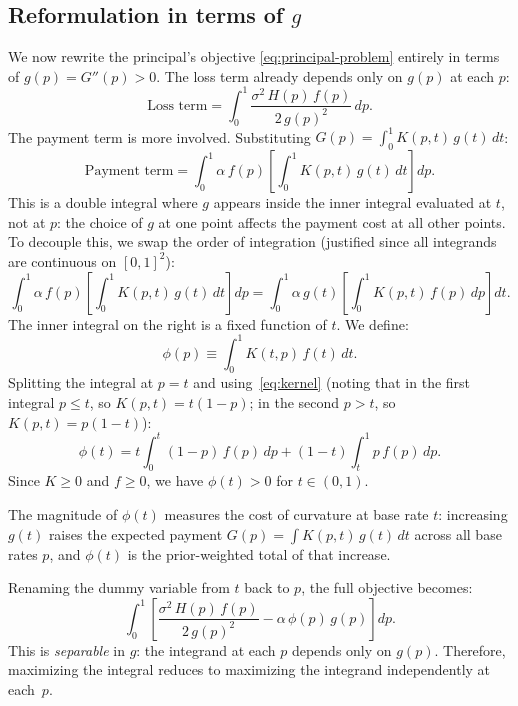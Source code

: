 \documentclass[11pt]{article}
\begin{document}
\subsection{Reformulation in terms of $g$}\label{sec:separable}

We now rewrite the principal's objective \eqref{eq:principal-problem} entirely in terms of $g(p) = G''(p) > 0$. The loss term already depends only on $g(p)$ at each $p$:
\[
\text{Loss term} = \int_0^1 \frac{\sigma^2\, H(p)\, f(p)}{2\, g(p)^2} \, dp.
\]
The payment term is more involved. Substituting $G(p) = \int_0^1 K(p,t)\, g(t)\, dt$:
\[
\text{Payment term} = \int_0^1 \alpha\, f(p) \left[\int_0^1 K(p,t)\, g(t)\, dt \right] dp.
\]
This is a double integral where $g$ appears inside the inner integral evaluated at $t$, not at $p$: the choice of $g$ at one point affects the payment cost at all other points. To decouple this, we swap the order of integration (justified since all integrands are continuous on $[0,1]^2$):
\[
\int_0^1 \alpha\, f(p) \left[\int_0^1 K(p,t)\, g(t)\, dt \right] dp = \int_0^1 \alpha\, g(t) \left[\int_0^1 K(p,t)\, f(p)\, dp \right] dt.
\]
The inner integral on the right is a fixed function of $t$. We define:
\begin{equation}\label{eq:phi-def}
\phi(p) \equiv \int_0^1 K(t,p)\,f(t)\,dt.
\end{equation}
Splitting the integral at $p = t$ and using~\eqref{eq:kernel} (noting that in the first integral $p \leq t$, so $K(p,t) = t(1-p)$; in the second $p > t$, so $K(p,t) = p(1-t)$):
\begin{equation}\label{eq:phi-explicit}
\phi(t) = t\int_0^t (1-p)\,f(p)\,dp + (1-t)\int_t^1 p\,f(p)\,dp.
\end{equation}
Since $K \geq 0$ and $f \geq 0$, we have $\phi(t) > 0$ for $t \in (0,1)$.

The magnitude of $\phi(t)$ measures the cost of curvature at base rate $t$: increasing $g(t)$ raises the expected payment $G(p) = \int K(p,t)\, g(t)\, dt$ across all base rates $p$, and $\phi(t)$ is the prior-weighted total of that increase.

Renaming the dummy variable from $t$ back to $p$, the full objective becomes:
\begin{equation}\label{eq:separable}
\int_0^1 \left[ \frac{\sigma^2\, H(p)\, f(p)}{2\, g(p)^2} - \alpha\, \phi(p)\, g(p) \right] dp.
\end{equation}
This is \emph{separable} in $g$: the integrand at each $p$ depends only on $g(p)$. Therefore, maximizing the integral reduces to maximizing the integrand independently at each~$p$.
\end{document}
